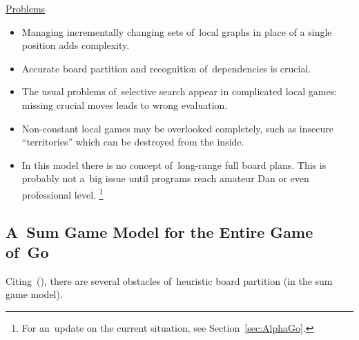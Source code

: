 \underline{Problems}
\begin{itemize}[-]
  \item Managing incrementally changing sets of~local graphs in place of a single position adds complexity.
  \item Accurate board partition and recognition of~dependencies is crucial.
  \item The usual problems of~selective search appear in complicated local games:
    missing crucial moves leads to wrong evaluation.
  \item Non-constant local games may be overlooked completely, such as insecure ``territories'' which can be destroyed from the inside.
  \item In this model there is no concept of~long-range full board plans.
    This is probably not a~big issue until programs reach amateur Dan or even professional level.%
    \footnote{For an~update on the current situation, see Section~\ref{sec:AlphaGo}.}
\end{itemize}

\subsection{A~Sum Game Model for the Entire Game of~Go}

Citing~(\cite{Muller1995computer}), there are several obstacles of~heuristic board partition (in the sum game model).

